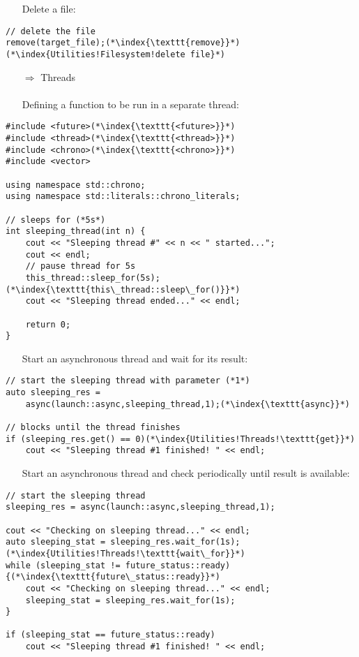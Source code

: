 \documentclass[10pt]{book}
\begin{document}
\begin{enumerate}
\item[] Delete a file:
\end{enumerate}
\begin{lstlisting}
// delete the file
remove(target_file);(*\index{\texttt{remove}}*)(*\index{Utilities!Filesystem!delete file}*)
\end{lstlisting}
\begin{enumerate}
\item[$\Rightarrow$] Threads\\ \\ Defining a function to be run in a separate thread:
\end{enumerate}
\begin{lstlisting}
#include <future>(*\index{\texttt{<future>}}*)
#include <thread>(*\index{\texttt{<thread>}}*)
#include <chrono>(*\index{\texttt{<chrono>}}*)
#include <vector>

using namespace std::chrono;
using namespace std::literals::chrono_literals;

// sleeps for (*5s*)
int sleeping_thread(int n) {
    cout << "Sleeping thread #" << n << " started...";
    cout << endl;
    // pause thread for 5s
    this_thread::sleep_for(5s);(*\index{\texttt{this\_thread::sleep\_for()}}*)
    cout << "Sleeping thread ended..." << endl;
    
    return 0;
}
\end{lstlisting}
\begin{enumerate}
\item[] Start an asynchronous thread and wait for its result:
\end{enumerate}
\begin{lstlisting}
// start the sleeping thread with parameter (*1*)
auto sleeping_res =
    async(launch::async,sleeping_thread,1);(*\index{\texttt{async}}*)
    
// blocks until the thread finishes
if (sleeping_res.get() == 0)(*\index{Utilities!Threads!\texttt{get}}*)
    cout << "Sleeping thread #1 finished! " << endl;
\end{lstlisting}
\begin{enumerate}
\item[] Start an asynchronous thread and check periodically until result is available:
\end{enumerate}
\begin{lstlisting}
// start the sleeping thread
sleeping_res = async(launch::async,sleeping_thread,1);
    
cout << "Checking on sleeping thread..." << endl;
auto sleeping_stat = sleeping_res.wait_for(1s);(*\index{Utilities!Threads!\texttt{wait\_for}}*)
while (sleeping_stat != future_status::ready) {(*\index{\texttt{future\_status::ready}}*)
    cout << "Checking on sleeping thread..." << endl;
    sleeping_stat = sleeping_res.wait_for(1s);
}

if (sleeping_stat == future_status::ready)
    cout << "Sleeping thread #1 finished! " << endl;
\end{lstlisting}
\end{document}
